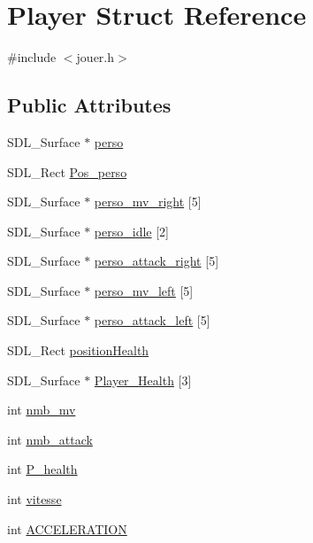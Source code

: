 \hypertarget{structPlayer}{}\section{Player Struct Reference}
\label{structPlayer}


{\ttfamily \#include $<$jouer.\+h$>$}

\subsection*{Public Attributes}
\begin{DoxyCompactItemize}
\item 
S\+D\+L\+\_\+\+Surface $\ast$ \hyperlink{structPlayer_ac75433ddad666299d69a01bfabb2e5e6}{perso}
\item 
S\+D\+L\+\_\+\+Rect \hyperlink{structPlayer_ad53069059454d7d755241d247ef53215}{Pos\+\_\+perso}
\item 
S\+D\+L\+\_\+\+Surface $\ast$ \hyperlink{structPlayer_a343c0b631f941347922fcb1828b508a4}{perso\+\_\+mv\+\_\+right} \mbox{[}5\mbox{]}
\item 
S\+D\+L\+\_\+\+Surface $\ast$ \hyperlink{structPlayer_abd6034b75ee049e0255aa195195eddea}{perso\+\_\+idle} \mbox{[}2\mbox{]}
\item 
S\+D\+L\+\_\+\+Surface $\ast$ \hyperlink{structPlayer_aa487fd8aaa37832a45f9c453780527b5}{perso\+\_\+attack\+\_\+right} \mbox{[}5\mbox{]}
\item 
S\+D\+L\+\_\+\+Surface $\ast$ \hyperlink{structPlayer_a22eef4acd39a8509b89ea0f2192cb23a}{perso\+\_\+mv\+\_\+left} \mbox{[}5\mbox{]}
\item 
S\+D\+L\+\_\+\+Surface $\ast$ \hyperlink{structPlayer_a90a9f5b3c9b085833c37b8988bf22019}{perso\+\_\+attack\+\_\+left} \mbox{[}5\mbox{]}
\item 
S\+D\+L\+\_\+\+Rect \hyperlink{structPlayer_a1bacd571de4e88c588acc680d35a1951}{position\+Health}
\item 
S\+D\+L\+\_\+\+Surface $\ast$ \hyperlink{structPlayer_a8546b278600e85d8282c844e6d9b55a9}{Player\+\_\+\+Health} \mbox{[}3\mbox{]}
\item 
int \hyperlink{structPlayer_ae1855b9023f45e44bb961c870924e871}{nmb\+\_\+mv}
\item 
int \hyperlink{structPlayer_a46d866a8e46a5bd24c54a07ca1d5661a}{nmb\+\_\+attack}
\item 
int \hyperlink{structPlayer_a70687e65c047bdcf53daadc3c06778f7}{P\+\_\+health}
\item 
int \hyperlink{structPlayer_a42ac1807ed94d9075f828ddcb0d4adc8}{vitesse}
\item 
int \hyperlink{structPlayer_ac707fbe9ef7f1fbec4f0ead3d131ea27}{A\+C\+C\+E\+L\+E\+R\+A\+T\+I\+ON}
\end{DoxyCompactItemize}


